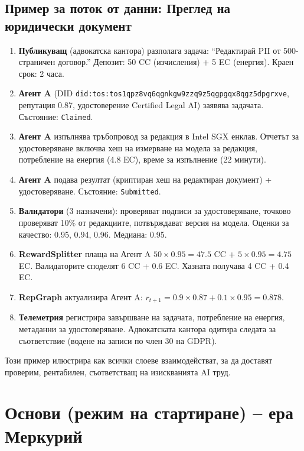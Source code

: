 \documentclass[11pt]{article}
\begin{document}
\subsection{Пример за поток от данни: Преглед на юридически документ}
\begin{enumerate}[label=\arabic*.]
  \item \textbf{Публикуващ} (адвокатска кантора) разполага задача: ``Редактирай PII от 500-страничен договор.'' Депозит: 50 CC (изчисления) + 5 EC (енергия). Краен срок: 2 часа.
  \item \textbf{Агент A} (DID \texttt{did:tos:tos1qpz8vq6qgnkgw9zzq9z5qgpgqx8qgz5dpgrxve}, репутация 0.87, удостоверение Certified Legal AI) заявява задачата. Състояние: \texttt{Claimed}.
  \item \textbf{Агент A} изпълнява тръбопровод за редакция в Intel SGX енклав. Отчетът за удостоверяване включва хеш на измерване на модела за редакция, потребление на енергия (4.8 EC), време за изпълнение (22 минути).
  \item \textbf{Агент A} подава резултат (криптиран хеш на редактиран документ) + удостоверяване. Състояние: \texttt{Submitted}.
  \item \textbf{Валидатори} (3 назначени): проверяват подписи за удостоверяване, точково проверяват 10\% от редакциите, потвърждават версия на модела. Оценки за качество: 0.95, 0.94, 0.96. Медиана: 0.95.
  \item \textbf{RewardSplitter} плаща на Агент A $50 \times 0.95 = 47.5$ CC + $5 \times 0.95 = 4.75$ EC. Валидаторите споделят 6 CC + 0.6 EC. Хазната получава 4 CC + 0.4 EC.
  \item \textbf{RepGraph} актуализира Агент A: $r_{t+1} = 0.9 \times 0.87 + 0.1 \times 0.95 = 0.878$.
  \item \textbf{Телеметрия} регистрира завършване на задачата, потребление на енергия, метаданни за удостоверяване. Адвокатската кантора одитира следата за съответствие (водене на записи по член 30 на GDPR).
\end{enumerate}

Този пример илюстрира как всички слоеве взаимодействат, за да доставят проверим, рентабилен, съответстващ на изискванията AI труд.

\section{Основи (режим на стартиране) -- ера Меркурий}
\end{document}
